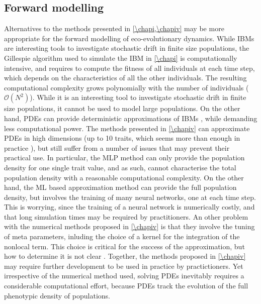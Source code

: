 \subsection{Forward modelling}
Alternatives to the methods presented in \cref{\chapi,\chapiv} may be more appropriate for the forward modelling of eco-evolutionary dynamics.
% 
While IBMs are interesting tools to investigate stochastic drift in finite size populations, the Gillespie algorithm \citep{Gillespie1976} used to simulate the IBM in \cref{\chapi} is computationally intensive, and requires to compute the fitness of all individuals at each time step, which depends on the characteristics of all the other individuals. The resulting computational complexity grows polynomially with the number of individuals ($\mathcal{O}(N^2)$). While it is an interesting tool to investigate stochastic drift in finite size populations, it cannot be used to model large populations. 
% 
On the other hand, PDEs can provide deterministic approximations of IBMs \citep{Champagnat2006}, while demanding less computational power. 
% 
% 
The methods presented in \cref{\chapiv} can approximate PDEs in high dimensions (up to 10 traits, which seems more than enough in practice \xxx), but still suffer from a number of issues that may prevent their practical use.
% 
In particular, the MLP method can only provide the population density for one single trait value, and as such, cannot characterise the total population density with a reasonable computational complexity. 
% 
On the other hand, the ML based approximation method can provide the full population density, but involves the training of many neural networks, one at each time step. This is worrying, since the training of a neural network is numerically costly, and that long simulation times may be required by practitioners. An other problem with the numerical methods proposed in \cref{\chapiv} is that they involve the tuning of meta parameters, inluding the choice of a kernel for the integration of the nonlocal term. This choice is critical for the success of the approximation, but how to determine it is not clear .
% 
Together, the methods proposed in \cref{\chapiv} may require further development to be used in practice by practictioners. 
% 
Yet irrespective of the numerical method used, solving PDEs inevitably requires a considerable computational effort, because PDEs track the evolution of the full phenotypic density of populations. 
